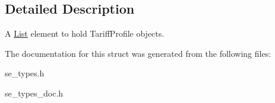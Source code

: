 \subsection{Detailed Description}
A \hyperlink{structList}{List} element to hold Tariff\+Profile objects. 

The documentation for this struct was generated from the following files\+:\begin{DoxyCompactItemize}
\item 
se\+\_\+types.\+h\item 
se\+\_\+types\+\_\+doc.\+h\end{DoxyCompactItemize}

